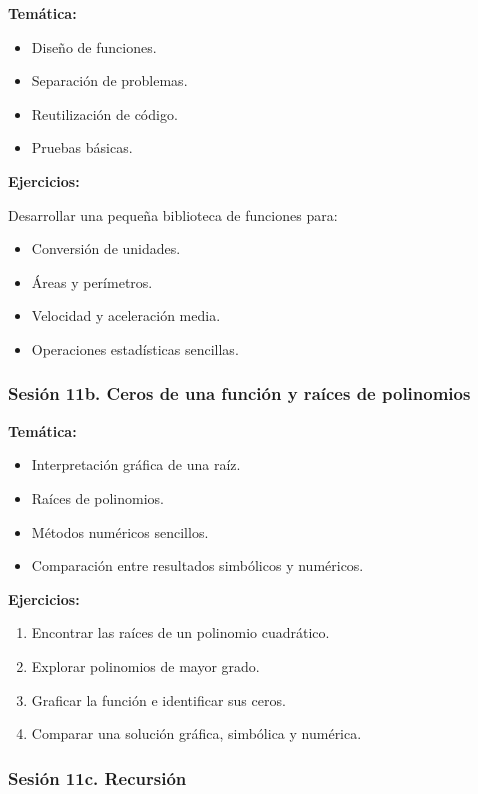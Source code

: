 \documentclass[12pt,letterpaper]{article}
\begin{document}
\textbf{Temática:}
\begin{itemize}[noitemsep]
    \item Diseño de funciones.
    \item Separación de problemas.
    \item Reutilización de código.
    \item Pruebas básicas.
\end{itemize}

\textbf{Ejercicios:}

Desarrollar una pequeña biblioteca de funciones para:

\begin{itemize}[noitemsep]
    \item Conversión de unidades.
    \item Áreas y perímetros.
    \item Velocidad y aceleración media.
    \item Operaciones estadísticas sencillas.
\end{itemize}
\subsubsection*{Sesión 11b. Ceros de una función y raíces de polinomios}

\textbf{Temática:}
\begin{itemize}[noitemsep]
    \item Interpretación gráfica de una raíz.
    \item Raíces de polinomios.
    \item Métodos numéricos sencillos.
    \item Comparación entre resultados simbólicos y numéricos.
\end{itemize}

\textbf{Ejercicios:}
\begin{enumerate}[noitemsep]
    \item Encontrar las raíces de un polinomio cuadrático.
    \item Explorar polinomios de mayor grado.
    \item Graficar la función e identificar sus ceros.
    \item Comparar una solución gráfica, simbólica y numérica.
\end{enumerate}

\subsubsection*{Sesión 11c. Recursión}
\end{document}
